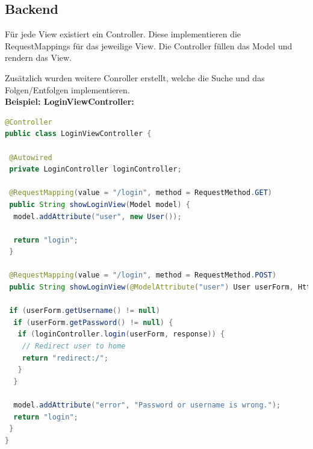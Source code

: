 \documentclass[
    a4paper
]{scrreprt}
\begin{document}
    \subsection{Backend}
	Für jede View existiert ein Controller. Diese implementieren die RequestMappings für das jeweilige View. Die Controller füllen das Model und rendern das View.
	
	Zusätzlich wurden weitere Conroller erstellt, welche die Suche und das Folgen/Entfolgen implementieren.\\
	
	\textbf{Beispiel: LoginViewController:}
	\begin{lstlisting}[language=java]
@Controller
public class LoginViewController {

 @Autowired
 private LoginController loginController;

 @RequestMapping(value = "/login", method = RequestMethod.GET)
 public String showLoginView(Model model) {
  model.addAttribute("user", new User());

  return "login";
 }

 @RequestMapping(value = "/login", method = RequestMethod.POST)
 public String showLoginView(@ModelAttribute("user") User userForm, HttpServletResponse response, Model model) {

 if (userForm.getUsername() != null)
  if (userForm.getPassword() != null) {
   if (loginController.login(userForm, response)) {
    // Redirect user to home
    return "redirect:/";
   }
  }

  model.addAttribute("error", "Password or username is wrong.");
  return "login";
 }
}
	\end{lstlisting}

\end{document}
